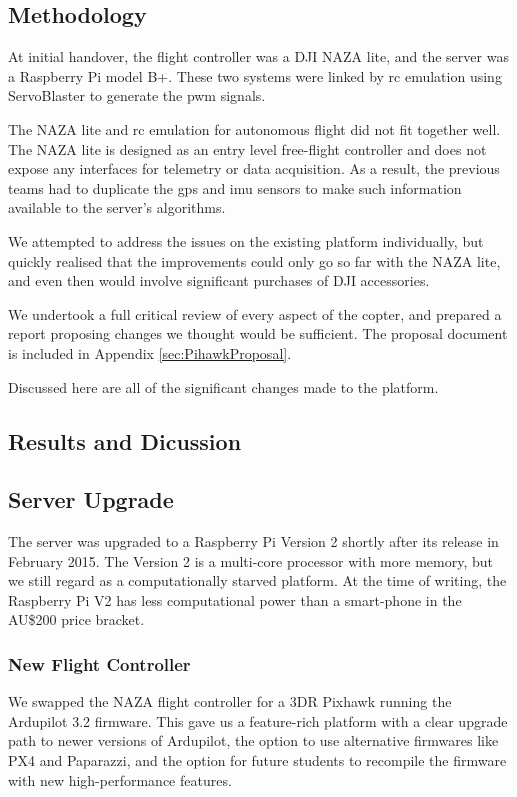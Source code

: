 \documentclass[a4paper, 11pt, titlepage]{article}
\begin{document}
    \subsection{Methodology}
      At initial handover, the flight controller was a DJI NAZA lite, and the server was a Raspberry Pi model B+.  These two systems were linked by \gls{rc} emulation using ServoBlaster \cite{ServoBlaster} to generate the \gls{pwm} signals.

      The NAZA lite and \gls{rc} emulation for autonomous flight did not fit together well. The NAZA lite is designed as an entry level free-flight controller and does not expose any interfaces for telemetry or data acquisition.  As a result, the previous teams had to duplicate the \gls{gps} and \gls{imu} sensors to make such information available to the server's algorithms.

      We attempted to address the issues on the existing platform individually, but quickly realised that the improvements could only go so far with the NAZA lite, and even then would involve significant purchases of DJI accessories.

      We undertook a full critical review of every aspect of the copter, and prepared a report proposing changes we thought would be sufficient.  The proposal document is included in Appendix \ref{sec:PihawkProposal}.

      Discussed here are all of the significant changes made to the platform.


  \subsection{Results and Dicussion}
    \subsection{Server Upgrade}
      The server was upgraded to a Raspberry Pi Version 2 shortly after its release in February 2015.  The Version 2 is a multi-core processor with more memory, but we still regard as a computationally starved platform.
      At the time of writing, the Raspberry Pi V2 has less computational power than a smart-phone in the AU\$200 price bracket.

    \subsubsection{New Flight Controller}
      We swapped the NAZA flight controller for a 3DR Pixhawk running the Ardupilot 3.2 firmware.  This gave us a feature-rich platform with a clear upgrade path to newer versions of Ardupilot, the option to use alternative firmwares like PX4 and Paparazzi, and the option for future students to recompile the firmware with new high-performance features.
\end{document}
